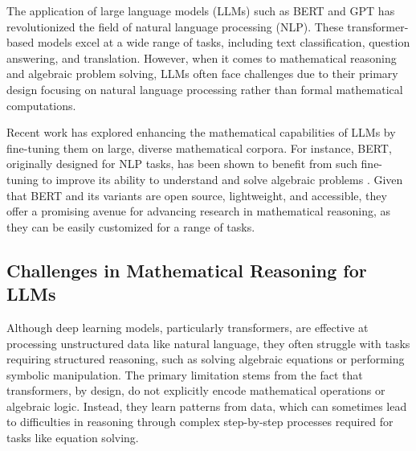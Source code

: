 \documentclass{article}
\begin{document}


The application of large language models (LLMs) such as BERT \cite{mathBERT} and GPT \cite{Brown_et_al._2020} has revolutionized the field of natural language processing (NLP). These transformer-based models excel at a wide range of tasks, including text classification, question answering, and translation. However, when it comes to mathematical reasoning and algebraic problem solving, LLMs often face challenges due to their primary design focusing on natural language processing rather than formal mathematical computations.

Recent work has explored enhancing the mathematical capabilities of LLMs by fine-tuning them on large, diverse mathematical corpora. For instance, BERT, originally designed for NLP tasks, has been shown to benefit from such fine-tuning to improve its ability to understand and solve algebraic problems \cite{mathBERT}. Given that BERT and its variants are open source, lightweight, and accessible, they offer a promising avenue for advancing research in mathematical reasoning, as they can be easily customized for a range of tasks.

\subsection{Challenges in Mathematical Reasoning for LLMs}

Although deep learning models, particularly transformers, are effective at processing unstructured data like natural language, they often struggle with tasks requiring structured reasoning, such as solving algebraic equations or performing symbolic manipulation. The primary limitation stems from the fact that transformers, by design, do not explicitly encode mathematical operations or algebraic logic. Instead, they learn patterns from data, which can sometimes lead to difficulties in reasoning through complex step-by-step processes required for tasks like equation solving.
\end{document}
